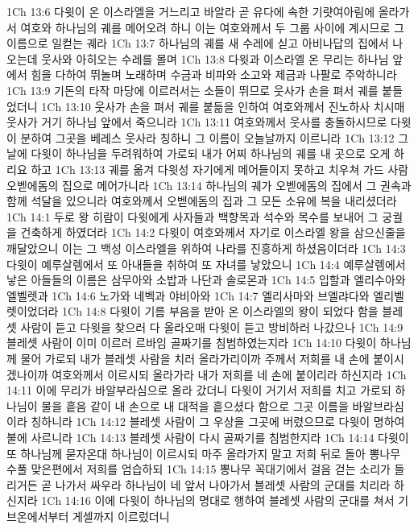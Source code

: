 1Ch 13:6  다윗이 온 이스라엘을 거느리고 바알라 곧 유다에 속한 기럇여아림에 올라가서 여호와 하나님의 궤를 메어오려 하니 이는 여호와께서 두 그룹 사이에 계시므로 그 이름으로 일컫는 궤라
1Ch 13:7  하나님의 궤를 새 수레에 싣고 아비나답의 집에서 나오는데 웃사와 아히오는 수레를 몰며
1Ch 13:8  다윗과 이스라엘 온 무리는 하나님 앞에서 힘을 다하여 뛰놀며 노래하며 수금과 비파와 소고와 제금과 나팔로 주악하니라
1Ch 13:9  기돈의 타작 마당에 이르러서는 소들이 뛰므로 웃사가 손을 펴서 궤를 붙들었더니
1Ch 13:10  웃사가 손을 펴서 궤를 붙듦을 인하여 여호와께서 진노하사 치시매 웃사가 거기 하나님 앞에서 죽으니라
1Ch 13:11  여호와께서 웃사를 충돌하시므로 다윗이 분하여 그곳을 베레스 웃사라 칭하니 그 이름이 오늘날까지 이르니라
1Ch 13:12  그 날에 다윗이 하나님을 두려워하여 가로되 내가 어찌 하나님의 궤를 내 곳으로 오게 하리요 하고
1Ch 13:13  궤를 옮겨 다윗성 자기에게 메어들이지 못하고 치우쳐 가드 사람 오벧에돔의 집으로 메어가니라
1Ch 13:14  하나님의 궤가 오벧에돔의 집에서 그 권속과 함께 석달을 있으니라 여호와께서 오벧에돔의 집과 그 모든 소유에 복을 내리셨더라
1Ch 14:1  두로 왕 히람이 다윗에게 사자들과 백향목과 석수와 목수를 보내어 그 궁궐을 건축하게 하였더라
1Ch 14:2  다윗이 여호와께서 자기로 이스라엘 왕을 삼으신줄을 깨달았으니 이는 그 백성 이스라엘을 위하여 나라를 진흥하게 하셨음이더라
1Ch 14:3  다윗이 예루살렘에서 또 아내들을 취하여 또 자녀를 낳았으니
1Ch 14:4  예루살렘에서 낳은 아들들의 이름은 삼무아와 소밥과 나단과 솔로몬과
1Ch 14:5  입할과 엘리수아와 엘벨렛과
1Ch 14:6  노가와 네벡과 야비아와
1Ch 14:7  엘리사마와 브엘랴다와 엘리벨렛이었더라
1Ch 14:8  다윗이 기름 부음을 받아 온 이스라엘의 왕이 되었다 함을 블레셋 사람이 듣고 다윗을 찾으러 다 올라오매 다윗이 듣고 방비하러 나갔으나
1Ch 14:9  블레셋 사람이 이미 이르러 르바임 골짜기를 침범하였는지라
1Ch 14:10  다윗이 하나님께 물어 가로되 내가 블레셋 사람을 치러 올라가리이까 주께서 저희를 내 손에 붙이시겠나이까 여호와께서 이르시되 올라가라 내가 저희를 네 손에 붙이리라 하신지라
1Ch 14:11  이에 무리가 바알부라심으로 올라 갔더니 다윗이 거기서 저희를 치고 가로되 하나님이 물을 흩음 같이 내 손으로 내 대적을 흩으셨다 함으로 그곳 이름을 바알브라심이라 칭하니라
1Ch 14:12  블레셋 사람이 그 우상을 그곳에 버렸으므로 다윗이 명하여 불에 사르니라
1Ch 14:13  블레셋 사람이 다시 골짜기를 침범한지라
1Ch 14:14  다윗이 또 하나님께 묻자온대 하나님이 이르시되 마주 올라가지 말고 저희 뒤로 돌아 뽕나무 수풀 맞은편에서 저희를 엄습하되
1Ch 14:15  뽕나무 꼭대기에서 걸음 걷는 소리가 들리거든 곧 나가서 싸우라 하나님이 네 앞서 나아가서 블레셋 사람의 군대를 치리라 하신지라
1Ch 14:16  이에 다윗이 하나님의 명대로 행하여 블레셋 사람의 군대를 쳐서 기브온에서부터 게셀까지 이르렀더니
